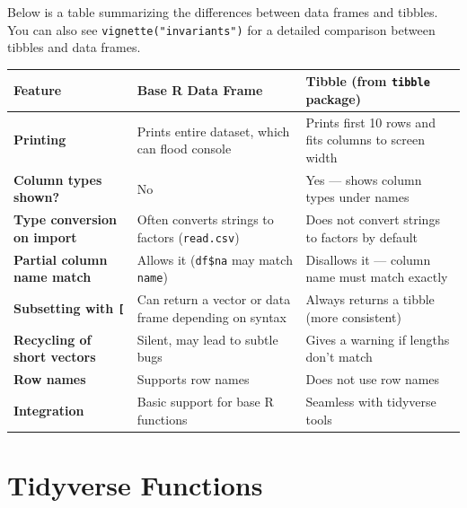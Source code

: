 \documentclass[
]{book}
\begin{document}
Below is a table summarizing the differences between data frames and tibbles. You can also see \texttt{vignette("invariants")} for a detailed comparison between tibbles and data frames.

\begin{longtable}[]{@{}
  >{\raggedright\arraybackslash}p{}
  >{\raggedright\arraybackslash}p{}
  >{\raggedright\arraybackslash}p{}@{}}
\toprule\noalign{}
\begin{minipage}[b]{\linewidth}\raggedright
Feature
\end{minipage} & \begin{minipage}[b]{\linewidth}\raggedright
Base R Data Frame
\end{minipage} & \begin{minipage}[b]{\linewidth}\raggedright
Tibble (from \texttt{tibble} package)
\end{minipage} \\
\midrule\noalign{}
\endhead
\bottomrule\noalign{}
\endlastfoot
\textbf{Printing} & Prints entire dataset, which can flood console & Prints first 10 rows and fits columns to screen width \\
\textbf{Column types shown?} & No & Yes --- shows column types under names \\
\textbf{Type conversion on import} & Often converts strings to factors (\texttt{read.csv}) & Does not convert strings to factors by default \\
\textbf{Partial column name match} & Allows it (\texttt{df\$na} may match \texttt{name}) & Disallows it --- column name must match exactly \\
\textbf{Subsetting with \texttt{{[}}} & Can return a vector or data frame depending on syntax & Always returns a tibble (more consistent) \\
\textbf{Recycling of short vectors} & Silent, may lead to subtle bugs & Gives a warning if lengths don't match \\
\textbf{Row names} & Supports row names & Does not use row names \\
\textbf{Integration} & Basic support for base R functions & Seamless with tidyverse tools \\
\end{longtable}

\section{Tidyverse Functions}\label{tidyverse-functions}
\end{document}
